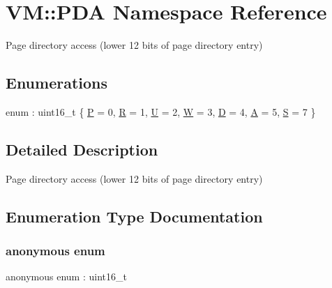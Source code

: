 \hypertarget{namespace_v_m_1_1_p_d_a}{}\section{VM\+:\+:P\+DA Namespace Reference}
\label{namespace_v_m_1_1_p_d_a}


Page directory access (lower 12 bits of page directory entry)  


\subsection*{Enumerations}
\begin{DoxyCompactItemize}
\item 
enum \+: uint16\+\_\+t \{ \newline
\hyperlink{namespace_v_m_1_1_p_d_a_a7a5d6d32b47f20a14422314b14fdc591a2f8ff50210f87689944543ed655971cb}{P} = 0, 
\hyperlink{namespace_v_m_1_1_p_d_a_a7a5d6d32b47f20a14422314b14fdc591a80249bc62c8a67e157d2b13cdf4325f7}{R} = 1, 
\hyperlink{namespace_v_m_1_1_p_d_a_a7a5d6d32b47f20a14422314b14fdc591ad295b7d3bddcf79dc55d6e5c90423c2b}{U} = 2, 
\hyperlink{namespace_v_m_1_1_p_d_a_a7a5d6d32b47f20a14422314b14fdc591a8a740302ea12c8d4c4d5a47ac1af683f}{W} = 3, 
\newline
\hyperlink{namespace_v_m_1_1_p_d_a_a7a5d6d32b47f20a14422314b14fdc591a6243d3f10651bfe05301f7cdfafaa6aa}{D} = 4, 
\hyperlink{namespace_v_m_1_1_p_d_a_a7a5d6d32b47f20a14422314b14fdc591a55148405937cb89c60ff92caaadf8dfa}{A} = 5, 
\hyperlink{namespace_v_m_1_1_p_d_a_a7a5d6d32b47f20a14422314b14fdc591a46023444e176bb33206552f231471c37}{S} = 7
 \}
\end{DoxyCompactItemize}


\subsection{Detailed Description}
Page directory access (lower 12 bits of page directory entry) 

\subsection{Enumeration Type Documentation}
\mbox{\label{namespace_v_m_1_1_p_d_a_a7a5d6d32b47f20a14422314b14fdc591}} 
\subsubsection{\texorpdfstring{anonymous enum}{anonymous enum}}
{\footnotesize\ttfamily anonymous enum \+: uint16\+\_\+t}

